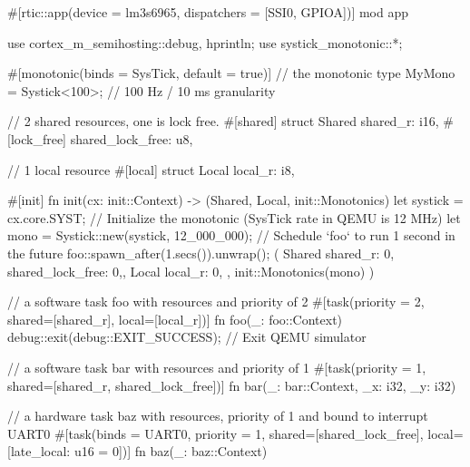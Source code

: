 #[rtic::app(device = lm3s6965, dispatchers = [SSI0, GPIOA])]
mod app {
    use cortex_m_semihosting::{debug, hprintln};
    use systick_monotonic::*;

    #[monotonic(binds = SysTick, default = true)]
    // the monotonic
    type MyMono = Systick<100>; // 100 Hz / 10 ms granularity

    // 2 shared resources, one is lock free.
    #[shared]
    struct Shared {
        shared_r: i16,
        #[lock_free]
        shared_lock_free: u8,
    }

    // 1 local resource
    #[local]
    struct Local {
        local_r: i8,
    }

    #[init]
    fn init(cx: init::Context) -> (Shared, Local, init::Monotonics) {
        let systick = cx.core.SYST;
        // Initialize the monotonic (SysTick rate in QEMU is 12 MHz)
        let mono = Systick::new(systick, 12_000_000);
        // Schedule `foo` to run 1 second in the future
        foo::spawn_after(1.secs()).unwrap();
        (
            Shared { shared_r: 0, shared_lock_free: 0,}, 
            Local { local_r: 0, }, 
            init::Monotonics(mono)
        )
    }

    // a software task foo with resources and priority of 2
    #[task(priority = 2, shared=[shared_r], local=[local_r])]
    fn foo(_: foo::Context) {
        debug::exit(debug::EXIT_SUCCESS); // Exit QEMU simulator
    }

    // a software task bar with resources and priority of 1
    #[task(priority = 1, shared=[shared_r, shared_lock_free])]
    fn bar(_: bar::Context, _x: i32, _y: i32) {
    }

    // a hardware task baz with resources, priority of 1 and bound to interrupt UART0
    #[task(binds = UART0, priority = 1, shared=[shared_lock_free], local=[late_local: u16 = 0])]
    fn baz(_: baz::Context){
    }
}
